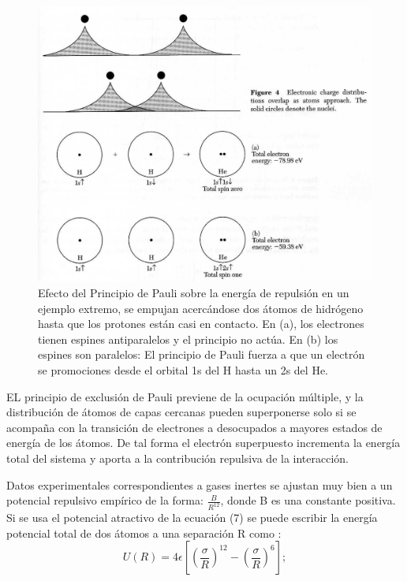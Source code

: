 \documentclass{article}
\begin{document}
\begin{figure}[h]
    \centering
    \includegraphics[width=1\textwidth]{superposicion_densidades.png}
    \caption{Efecto del Principio de Pauli sobre la energía de repulsión en un ejemplo extremo, se empujan acercándose dos átomos de hidrógeno hasta que los protones están casi en contacto. En (a), los electrones tienen espines antiparalelos y el principio no actúa. En (b) los espines son paralelos: El principio de Pauli fuerza a que un electrón se promociones desde el orbital 1s del H hasta un 2s del He.}
    \label{Figura 1}
\end{figure}

EL principio de exclusión de Pauli previene de la ocupación múltiple, y la distribución de átomos de capas cercanas pueden superponerse solo si se acompaña con la transición de electrones a desocupados a mayores estados de energía de los átomos. De tal forma el electrón superpuesto incrementa la energía total del sistema y aporta a la contribución repulsiva de la interacción. 


Datos experimentales correspondientes a gases inertes se ajustan muy bien a un potencial repulsivo empírico de la forma: $\frac{B}{R^{12}}$, donde B es una constante positiva.
Si se usa el potencial atractivo  de la ecuación (7) se puede escribir la energía potencial total de dos átomos a una separación R como :\\

\begin{equation}
    U(R)=4\epsilon\left[\left(\frac{\sigma}{R}\right)^{12}-\left(\frac{\sigma}{R}\right)^{6}\right];
\end{equation}{}
\end{document}
